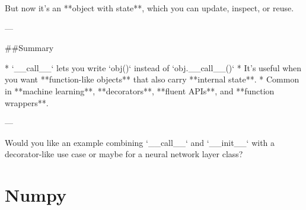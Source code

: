 \documentclass{article}
\begin{document}
But now it's an **object with state**, which you can update, inspect, or reuse.

---

##Summary

* `__call__` lets you write `obj()` instead of `obj.__call__()`
* It's useful when you want **function-like objects** that also carry **internal state**.
* Common in **machine learning**, **decorators**, **fluent APIs**, and **function wrappers**.

---

Would you like an example combining `__call__` and `__init__` with a decorator-like use case or maybe for a neural network layer class?


\section{Numpy}
\end{document}
